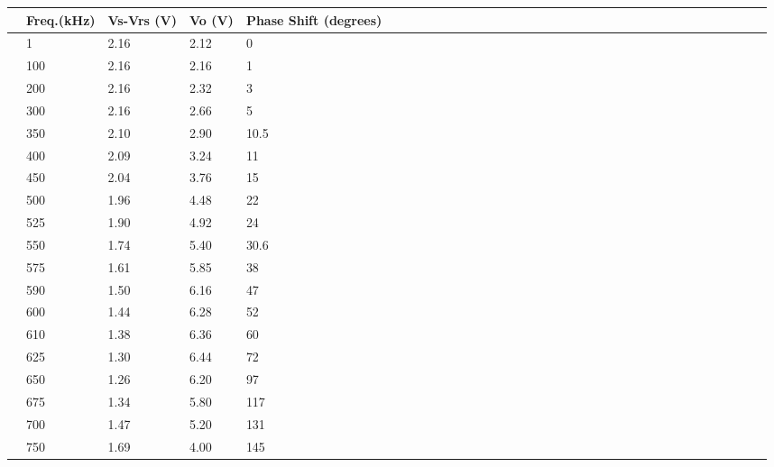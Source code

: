 \documentclass[10pt,twocolumn]{article}
\begin{document}
\begin{table}
	\begin{tabularx}{1\linewidth}{ lXXXX|cXXXXXXXXXXXXXXXXXXXXXXXXXXXXX }
		\hline
		 & \textbf{Freq.(kHz)} & \textbf{Vs-Vrs (V)} & \textbf{Vo (V)} & \textbf{Phase Shift   (degrees)}\\
		\hline
		& 1 & 2.16 & 2.12 & 0 \\
	 
		\cline{1-5}
		& 100 & 2.16 & 2.16 & 1 \\
	
		\cline{1-5}
		& 200 & 2.16 & 2.32 & 3 \\
		
		\cline{1-5}
		& 300 & 2.16 & 2.66 & 5 \\
		
		\cline{1-5}
		& 350 & 2.10 & 2.90 & 10.5 \\
		
		\cline{1-5}
		& 400 & 2.09 & 3.24 & 11 \\
		
		\cline{1-5}
		& 450 & 2.04 & 3.76 & 15\\
		
		\cline{1-5}
		& 500 & 1.96 & 4.48 & 22 \\
	
		\cline{1-5}
		& 525 & 1.90 & 4.92 & 24 \\
		
		\cline{1-5}
		& 550 & 1.74 & 5.40 & 30.6 \\
		
		\cline{1-5}
		& 575 & 1.61 & 5.85 & 38 \\
		
		\cline{1-5}
		& 590 & 1.50 & 6.16 & 47 \\
		
		\cline{1-5}
		& 600 & 1.44 & 6.28 & 52 \\
		
		\cline{1-5}
		& 610 & 1.38 & 6.36 & 60 \\
	
		\cline{1-5}
		& 625 & 1.30 & 6.44 & 72 \\
		
		\cline{1-5}
		& 650 & 1.26  & 6.20 & 97 \\		
		\cline{1-5}
		& 675 & 1.34 & 5.80 & 117 \\
		
		\cline{1-5}
		& 700 & 1.47 & 5.20 & 131 \\
		
		\cline{1-5}
		& 750 & 1.69 & 4.00 & 145 \\
		

\end{tabularx}
\end{table}
\end{document}
